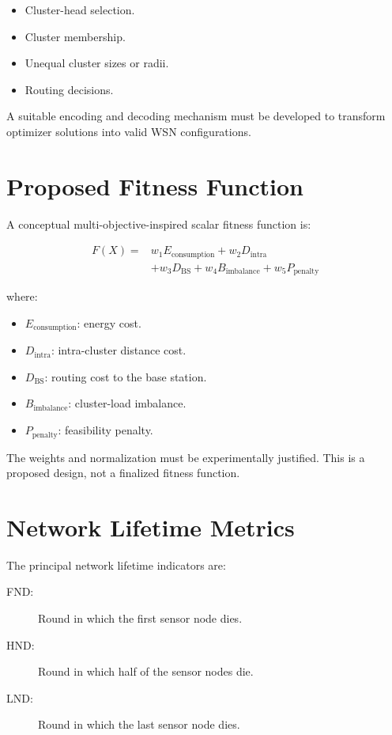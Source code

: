 \documentclass[12pt,a4paper]{report}
\begin{document}
\begin{itemize}
    \item Cluster-head selection.
    \item Cluster membership.
    \item Unequal cluster sizes or radii.
    \item Routing decisions.
\end{itemize}

A suitable encoding and decoding mechanism must
be developed to transform optimizer solutions into
valid WSN configurations.

\section{Proposed Fitness Function}

A conceptual multi-objective-inspired scalar
fitness function is:

\begin{equation}
\begin{split}
F(X)={}&w_1E_{\mathrm{consumption}}
+w_2D_{\mathrm{intra}}\\
&+w_3D_{\mathrm{BS}}
+w_4B_{\mathrm{imbalance}}
+w_5P_{\mathrm{penalty}}
\end{split}
\end{equation}

where:

\begin{itemize}
    \item $E_{\mathrm{consumption}}$: energy cost.
    \item $D_{\mathrm{intra}}$: intra-cluster distance cost.
    \item $D_{\mathrm{BS}}$: routing cost to the base station.
    \item $B_{\mathrm{imbalance}}$: cluster-load imbalance.
    \item $P_{\mathrm{penalty}}$: feasibility penalty.
\end{itemize}

The weights and normalization must be experimentally
justified. This is a proposed design, not a finalized
fitness function.

\section{Network Lifetime Metrics}

The principal network lifetime indicators are:

\begin{description}
    \item[FND:] Round in which the first sensor node dies.
    \item[HND:] Round in which half of the sensor nodes die.
    \item[LND:] Round in which the last sensor node dies.
\end{description}
\end{document}
